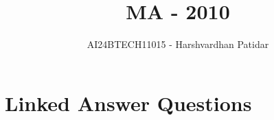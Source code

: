\documentclass[journal]{IEEEtran}
\begin{document}

\vspace{3cm}

\title{MA - 2010}
\author{AI24BTECH11015 - Harshvardhan Patidar}
 \maketitle
{\let\newpage\relax\maketitle}

\renewcommand{\thefigure}{\theenumi}
\renewcommand{\thetable}{\theenumi}
\setlength{\intextsep}{10pt} %


\renewcommand{\thetable}{\theenumi}

\section*{Linked Answer Questions}
\end{document}
